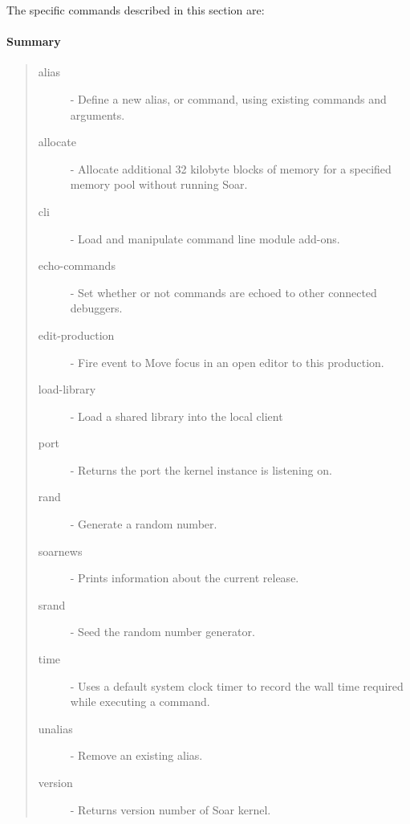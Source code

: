 
The specific commands described in this section are:


\paragraph{Summary}
\begin{quote}
\begin{description}
\item[alias] - Define a new alias, or command, using existing commands and arguments.
\item[allocate] - Allocate additional 32 kilobyte blocks of memory for a specified memory pool without running Soar.
\item[cli] - Load and manipulate command line module add-ons.
\item[echo-commands] - Set whether or not commands are echoed to other connected debuggers. 
\item[edit-production] - Fire event to Move focus in an open editor to this production.
\item[load-library] - Load a shared library into the local client
\item[port] - Returns the port the kernel instance is listening on.
\item[rand] - Generate a random number.
\item[soarnews] - Prints information about the current release.
\item[srand] -  Seed the random number generator.
\item[time] - Uses a default system clock timer to record the wall time required while executing a command.
\item[unalias] - Remove an existing alias.
\item[version] - Returns version number of Soar kernel.
\end{description}
\end{quote}














